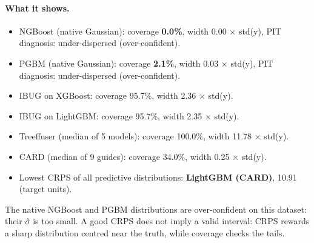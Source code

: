 \documentclass[11pt]{article}
\begin{document}
\paragraph{What it shows.}
\begin{itemize}
\item NGBoost (native Gaussian): coverage \textbf{0.0\%}, width 0.00 $\times$ std(y), PIT diagnosis: under-dispersed (over-confident).
\item PGBM (native Gaussian): coverage \textbf{2.1\%}, width 0.03 $\times$ std(y), PIT diagnosis: under-dispersed (over-confident).
\item IBUG on XGBoost: coverage 95.7\%, width 2.36 $\times$ std(y).
\item IBUG on LightGBM: coverage 95.7\%, width 2.35 $\times$ std(y).
\item Treeffuser (median of 5 models): coverage 100.0\%, width 11.78 $\times$ std(y).
\item CARD (median of 9 guides): coverage 34.0\%, width 0.25 $\times$ std(y).
\item Lowest CRPS of all predictive distributions: \textbf{LightGBM (CARD)}, 10.91 (target units).
\end{itemize}
\begin{insight}[Takeaway RQ3]
The native NGBoost and PGBM distributions are over-confident on this dataset: their $\sigma$̂ is too small. A good CRPS does not imply a valid interval: CRPS rewards a sharp distribution centred near the truth, while coverage checks the tails.
\end{insight}
\end{document}
